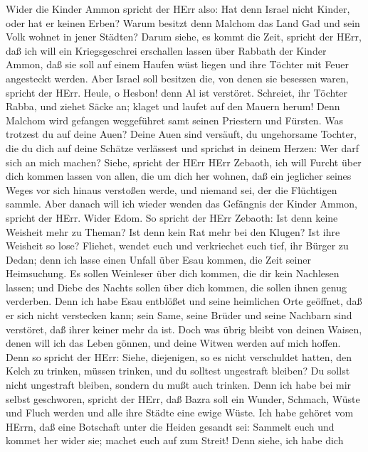  Wider die Kinder Ammon spricht der HErr also: Hat denn
Israel nicht Kinder, oder hat er keinen Erben? Warum besitzt denn
Malchom das Land Gad und sein Volk wohnet in jener Städten? 
Darum siehe, es kommt die Zeit, spricht der HErr, daß ich will ein
Kriegsgeschrei erschallen lassen über Rabbath der Kinder Ammon, daß sie
soll auf einem Haufen wüst liegen und ihre Töchter mit Feuer angesteckt
werden. Aber Israel soll besitzen die, von denen sie besessen waren,
spricht der HErr.  Heule, o Hesbon! denn Al ist verstöret.
Schreiet, ihr Töchter Rabba, und ziehet Säcke an; klaget und laufet auf
den Mauern herum! Denn Malchom wird gefangen weggeführet samt seinen
Priestern und Fürsten.  Was trotzest du auf deine Auen?
Deine Auen sind versäuft, du ungehorsame Tochter, die du dich auf deine
Schätze verlässest und sprichst in deinem Herzen: Wer darf sich an mich
machen?  Siehe, spricht der HErr HErr Zebaoth, ich will
Furcht über dich kommen lassen von allen, die um dich her wohnen, daß
ein jeglicher seines Weges vor sich hinaus verstoßen werde, und niemand
sei, der die Flüchtigen sammle.  Aber danach will ich wieder
wenden das Gefängnis der Kinder Ammon, spricht der HErr. 
Wider Edom. So spricht der HErr Zebaoth: Ist denn keine Weisheit mehr zu
Theman? Ist denn kein Rat mehr bei den Klugen? Ist ihre Weisheit so
lose?  Fliehet, wendet euch und verkriechet euch tief, ihr
Bürger zu Dedan; denn ich lasse einen Unfall über Esau kommen, die Zeit
seiner Heimsuchung.  Es sollen Weinleser über dich kommen,
die dir kein Nachlesen lassen; und Diebe des Nachts sollen über dich
kommen, die sollen ihnen genug verderben.  Denn ich habe
Esau entblößet und seine heimlichen Orte geöffnet, daß er sich nicht
verstecken kann; sein Same, seine Brüder und seine Nachbarn sind
verstöret, daß ihrer keiner mehr da ist.  Doch was übrig
bleibt von deinen Waisen, denen will ich das Leben gönnen, und deine
Witwen werden auf mich hoffen.  Denn so spricht der HErr:
Siehe, diejenigen, so es nicht verschuldet hatten, den Kelch zu trinken,
müssen trinken, und du solltest ungestraft bleiben? Du sollst nicht
ungestraft bleiben, sondern du mußt auch trinken.  Denn ich
habe bei mir selbst geschworen, spricht der HErr, daß Bazra soll ein
Wunder, Schmach, Wüste und Fluch werden und alle ihre Städte eine ewige
Wüste.  Ich habe gehöret vom HErrn, daß eine Botschaft
unter die Heiden gesandt sei: Sammelt euch und kommet her wider sie;
machet euch auf zum Streit!  Denn siehe, ich habe dich
